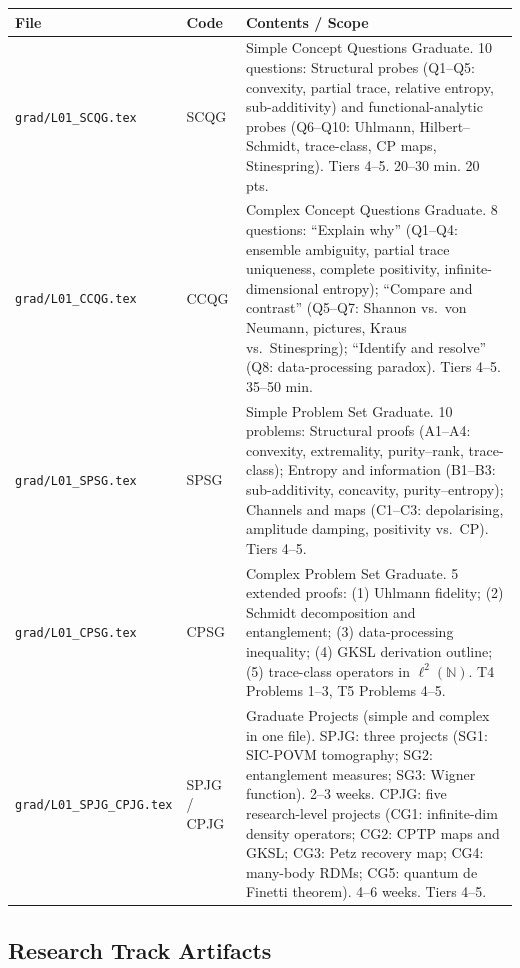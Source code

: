 \documentclass[11pt,a4paper]{article}
\begin{document}
\begin{tabularx}{\textwidth}{llX}
\toprule
\textbf{File} & \textbf{Code} & \textbf{Contents / Scope}\\
\midrule
\texttt{grad/L01\_SCQG.tex}
& SCQG
& Simple Concept Questions Graduate. 10 questions:
  Structural probes (Q1--Q5: convexity, partial trace, relative entropy,
  sub-additivity) and functional-analytic probes (Q6--Q10: Uhlmann,
  Hilbert--Schmidt, trace-class, CP maps, Stinespring).
  Tiers 4--5. 20--30 min. 20 pts.\\
\addlinespace
\texttt{grad/L01\_CCQG.tex}
& CCQG
& Complex Concept Questions Graduate. 8 questions:
  ``Explain why'' (Q1--Q4: ensemble ambiguity, partial trace uniqueness,
  complete positivity, infinite-dimensional entropy);
  ``Compare and contrast'' (Q5--Q7: Shannon vs.\ von Neumann, pictures,
  Kraus vs.\ Stinespring); ``Identify and resolve'' (Q8: data-processing paradox).
  Tiers 4--5. 35--50 min.\\
\addlinespace
\texttt{grad/L01\_SPSG.tex}
& SPSG
& Simple Problem Set Graduate. 10 problems:
  Structural proofs (A1--A4: convexity, extremality, purity--rank, trace-class);
  Entropy and information (B1--B3: sub-additivity, concavity, purity--entropy);
  Channels and maps (C1--C3: depolarising, amplitude damping, positivity vs.\ CP).
  Tiers 4--5.\\
\addlinespace
\texttt{grad/L01\_CPSG.tex}
& CPSG
& Complex Problem Set Graduate. 5 extended proofs:
  (1) Uhlmann fidelity; (2) Schmidt decomposition and entanglement;
  (3) data-processing inequality; (4) GKSL derivation outline;
  (5) trace-class operators in $\ell^2(\mathbb{N})$.
  T4 Problems 1--3, T5 Problems 4--5.\\
\addlinespace
\texttt{grad/L01\_SPJG\_CPJG.tex}
& SPJG / CPJG
& Graduate Projects (simple and complex in one file).
  SPJG: three projects (SG1: SIC-POVM tomography; SG2: entanglement measures;
  SG3: Wigner function). 2--3 weeks.
  CPJG: five research-level projects (CG1: infinite-dim density operators;
  CG2: CPTP maps and GKSL; CG3: Petz recovery map; CG4: many-body RDMs;
  CG5: quantum de Finetti theorem). 4--6 weeks.
  Tiers 4--5.\\
\bottomrule
\end{tabularx}

\subsection*{Research Track Artifacts}
\end{document}
